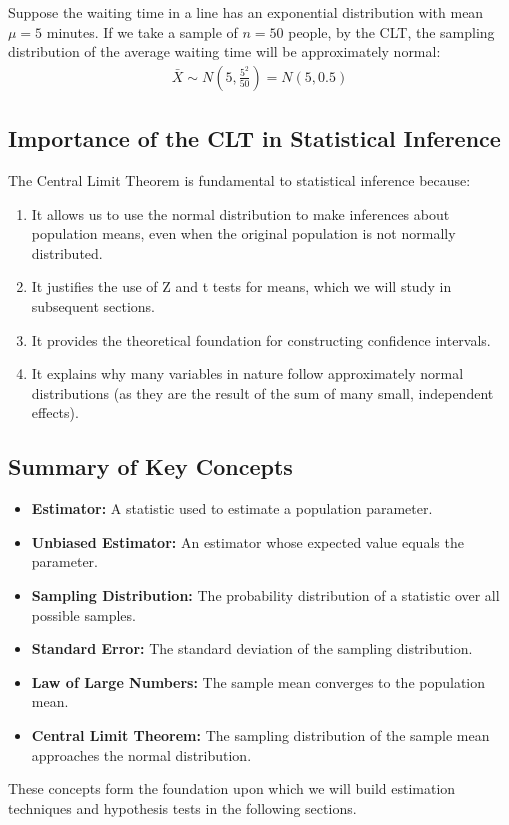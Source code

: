 \begin{ejemplo}
	\label{exmp:5.1.3}
	Suppose the waiting time in a line has an exponential distribution with mean $\mu = 5$ minutes. If we take a sample of $n = 50$ people, by the CLT, the sampling distribution of the average waiting time will be approximately normal:
	\begin{align}
		\bar{X} \sim N\left(5, \frac{5^2}{50}\right) = N(5, 0.5)
	\end{align}
\end{ejemplo}

\subsection*{Importance of the CLT in Statistical Inference}

The Central Limit Theorem is fundamental to statistical inference because:

\begin{enumerate}
	\item It allows us to use the normal distribution to make inferences about population means, even when the original population is not normally distributed.
	
	\item It justifies the use of Z and t tests for means, which we will study in subsequent sections.
	
	\item It provides the theoretical foundation for constructing confidence intervals.
	
	\item It explains why many variables in nature follow approximately normal distributions (as they are the result of the sum of many small, independent effects).
\end{enumerate}

\subsection*{Summary of Key Concepts}

\begin{itemize}
	\item \textbf{Estimator:} A statistic used to estimate a population parameter.
	\item \textbf{Unbiased Estimator:} An estimator whose expected value equals the parameter.
	\item \textbf{Sampling Distribution:} The probability distribution of a statistic over all possible samples.
	\item \textbf{Standard Error:} The standard deviation of the sampling distribution.
	\item \textbf{Law of Large Numbers:} The sample mean converges to the population mean.
	\item \textbf{Central Limit Theorem:} The sampling distribution of the sample mean approaches the normal distribution.
\end{itemize}

These concepts form the foundation upon which we will build estimation techniques and hypothesis tests in the following sections.
